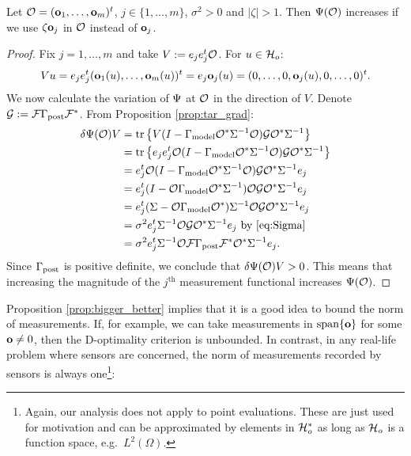 \begin{proposition}\label{prop:bigger_better}
  Let $\mathcal{O} = (\mathbf{o}_1,\dots,\mathbf{o}_m)^t$, $j \in \{1,\dots,m\}$,
  $\sigma^2 > 0$ and $|\zeta| > 1$. Then $\Psi(\mathcal{O})$ increases if we
  use $\zeta \mathbf{o}_j$ in $\mathcal{O}$ instead of $\mathbf{o}_j$.
\end{proposition}

\begin{proof} 
  Fix $j=1,\dots,m$ and take $V:= e_j e_j^t \mathcal{O}$. For $u
  \in \mathcal{H}_o$:
  \begin{equation*}
    Vu = e_je_j^t (\meas_1(u),\dots,\meas_m(u) )^t = e_j \meas_j(u)
    = (0,\dots,0,\meas_j(u),0,\dots,0)^t.
  \end{equation*}
  We now calculate the variation of $\Psi$ at $\mathcal{O}$ in the direction
  of $V$. Denote $\mathcal{G}: = \mathcal{F} \Gamma_{\textup{post}} \mathcal{F}^*$. From Proposition
  \ref{prop:tar_grad}:
  \begin{align*}
     \delta \tar(\obs) V 
    &= \tr{V ( I - \modcov \obs^*\Sigma^{-1}\obs) \tmp \obs^* \Sigma^{-1}} \\
    &= \tr{e_je_j^t \obs ( I - \modcov \obs^*\Sigma^{-1}\obs) \tmp \obs^* \Sigma^{-1}} \\
    &= e_j^t \obs ( I - \modcov \obs^*\Sigma^{-1}\obs) \tmp \obs^* \Sigma^{-1}e_j \\
    &= e_j^t ( I - \obs \modcov \obs^*\Sigma^{-1})\obs \tmp \obs^* \Sigma^{-1}e_j \\  
    &=  e_j^t(\Sigma-\obs \modcov \obs^*) \Sigma^{-1}\obs \tmp \obs^* \Sigma^{-1}e_j \\
    &=\sigma^2 e_j^t \Sigma^{-1}\obs \tmp \obs^* \Sigma^{-1}e_j
    \text{ by \eqref{eq:Sigma} }\\
    &=\sigma^2 e_j^t \Sigma^{-1}\obs \fwd \postcov \fwd^* \obs^* \Sigma^{-1}e_j.
  \end{align*} 
  Since $\Gamma_{\textup{post}}$ is positive definite, we conclude that $\delta
  \Psi(\mathcal{O}) V > 0$. This means that increasing the magnitude of the
  $j^{\text{th}}$ measurement functional increases $\Psi(\mathcal{O})$.
\end{proof}

Proposition \ref{prop:bigger_better} implies that it is a good idea to
bound the norm of measurements. If, for example, we can take
measurements in $\textup{span}\{\mathbf{o}\}$ for some $\mathbf{o} \neq 0$, then
the D-optimality criterion is unbounded. In contrast, in any real-life
problem where sensors are concerned, the norm of measurements recorded
by sensors is always one\footnote{Again, our analysis does not apply
to point evaluations. These are just used for motivation and can be
approximated by elements in $\mathcal{H}_o^*$ as long as $\mathcal{H}_o$ is a function
space, e.g.~$L^2(\Omega)$.}:

